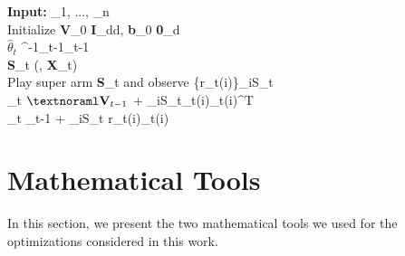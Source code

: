 \begin{algorithm}
	\caption{\ccucb}
	\label{alg:ccucb}
	\textbf{Input:} \alpha_1, ..., \alpha_n\\
	Initialize \textbf{V}_0 \leftarrow \textbf{I}_{d\times d}, \textbf{b}_0 \leftarrow \textbf{0}_d \\
	{
		$\hat{\theta}_t$ \leftarrow {}^{-1}_{t-1}_{t-1}\\
		\textbf{S}_t \leftarrow {}({}, \textnormal{\bf X}_t)\\
		\textnormal{Play super arm }\textbf{S}_t \textnormal { and observe} \{r_t(i)\}_{i\in S_t}\\
		_t \leftarrow $\nb{V}_{t-1}$ + \sum_{i\in S_t}\nb{x}_t(i)_t(i)^T\\
		_t \leftarrow {}_{t-1} + \sum_{i\in S_t} r_t(i)_t(i)\\
	}
\end{algorithm}



\section{Mathematical Tools}
\label{sec:mathematical tools}
In this section, we present the two mathematical tools we used for the optimizations considered in this work.
